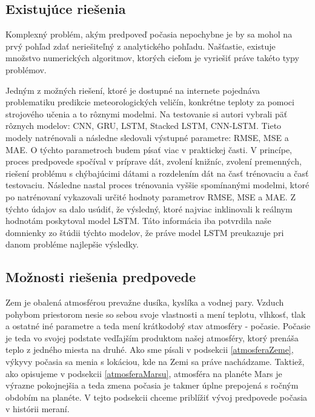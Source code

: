\newpage
\subsection{Existujúce riešenia}
Komplexný problém, akým predpoveď počasia nepochybne je by sa mohol na prvý pohľad zdať neriešiteľný z analytického pohľadu. Našťastie, existuje množstvo numerických algoritmov, ktorých cieľom je vyriešiť práve takéto typy problémov. 

Jedným z možných riešení, ktoré je dostupné na internete pojednáva problematiku predikcie meteorologických veličín, konkrétne teploty za pomoci strojového učenia a to rôznymi modelmi. Na testovanie si autori vybrali päť rôznych modelov: CNN, GRU, LSTM, Stacked LSTM, CNN-LSTM. Tieto modely natrénovali a následne sledovali výstupné parametre: RMSE, MSE a MAE. O týchto parametroch budem písať viac v praktickej časti. V princípe, proces predpovede spočíval v príprave dát, zvolení knižníc, zvolení premenných, riešení problému s chýbajúcimi dátami a rozdelením dát na časť trénovaciu a časť testovaciu. Následne nastal proces trénovania vyššie spomínanými modelmi, ktoré po natrénovaní vykazovali určité hodnoty parametrov RMSE, MSE a MAE. Z týchto údajov sa dalo usúdiť, že výsledný, ktoré najviac inklinovali k reálnym hodnotám poskytoval model LSTM. Táto informácia iba potvrdila naše domnienky zo štúdii týchto modelov, že práve model LSTM preukazuje pri danom probléme najlepšie výsledky. 

\subsection{Možnosti riešenia predpovede}
Zem je obalená atmosférou prevažne dusíka, kyslíka a vodnej pary. Vzduch pohybom priestorom nesie so sebou svoje vlastnosti a mení teplotu, vlhkosť, tlak a ostatné iné parametre a teda mení krátkodobý stav atmosféry - počasie. Počasie je teda vo svojej podstate vedľajším produktom našej atmosféry, ktorý prenáša teplo z jedného miesta na druhé.
Ako sme písali v podsekcii \ref{atmosferaZeme}, výkyvy počasia sa menia s lokáciou, kde na Zemi sa práve nachádzame. Taktiež, ako opisujeme v podsekcii \ref{atmosferaMarsu}, atmosféra na planéte Mars je výrazne pokojnejšia a teda zmena počasia je takmer úplne prepojená s ročným obdobím na planéte.
V tejto podsekcii chceme priblížiť vývoj predpovede počasia v histórii meraní.


